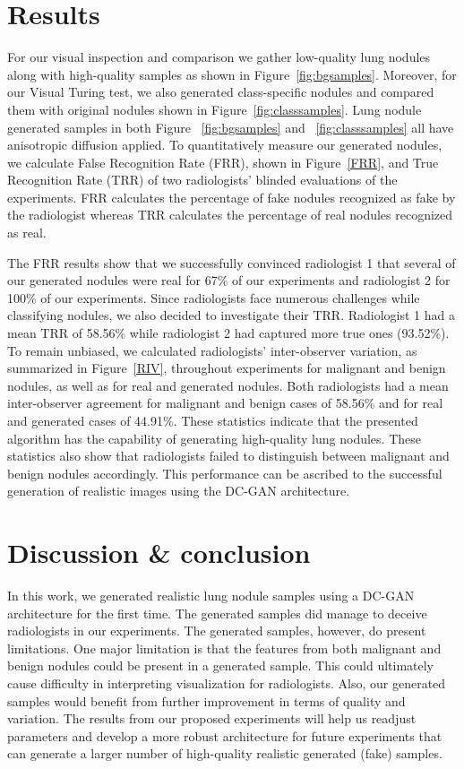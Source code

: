 \documentclass{article}
\begin{document}
\section{Results}
For our visual inspection and comparison we gather low-quality lung nodules along with high-quality samples as shown in Figure~\ref{fig:bgsamples}. Moreover, for our Visual Turing test, we also generated class-specific nodules and compared them with original nodules shown in Figure~\ref{fig:classsamples}. Lung nodule generated samples in both Figure ~\ref{fig:bgsamples} and ~\ref{fig:classsamples} all have anisotropic diffusion applied. 
To quantitatively measure our generated nodules, we calculate False Recognition Rate (FRR), shown in Figure~\ref{FRR}, and True Recognition Rate (TRR) of two radiologists' blinded evaluations of the experiments. FRR calculates the percentage of fake nodules recognized as fake by the radiologist whereas TRR calculates the percentage of real nodules recognized as real.

The FRR results show that we successfully convinced radiologist 1 that several of our generated nodules were real for 67\% of our experiments and radiologist 2 for 100\% of our experiments. Since radiologists face numerous challenges while classifying nodules, we also decided to investigate their TRR. Radiologist 1 had a mean TRR of 58.56\% while radiologist 2 had captured more true ones (93.52\%). To remain unbiased, we calculated radiologists' inter-observer variation, as summarized in Figure~\ref{RIV}, throughout experiments for malignant and benign nodules, as well as for real and generated nodules. Both radiologists had a mean inter-observer agreement for malignant and benign cases of 58.56\% and for real and generated cases of 44.91\%. These statistics indicate that the presented algorithm has the capability of generating high-quality lung nodules. These statistics also show that radiologists failed to distinguish between malignant and benign nodules accordingly. This performance can be ascribed to the successful generation of realistic images using the DC-GAN architecture.

\section{Discussion \& conclusion}
In this work, we generated realistic lung nodule samples using a DC-GAN architecture for the first time. The generated samples did manage to deceive radiologists in our experiments. The generated samples, however, do present limitations. One major limitation is that the features from both malignant and benign nodules could be present in a generated sample. This could ultimately cause difficulty in interpreting visualization for radiologists. Also, our generated samples would benefit from further improvement in terms of quality and variation. The results from our proposed experiments will help us readjust parameters and develop a more robust architecture for future experiments that can generate a larger number of high-quality realistic generated (fake) samples.
\end{document}
